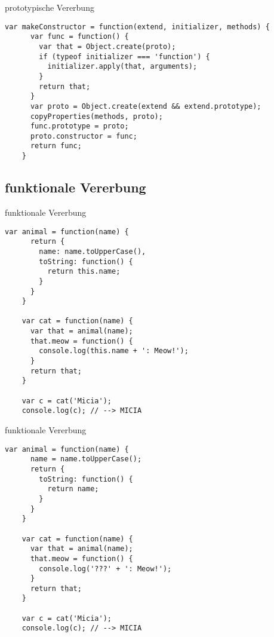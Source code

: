 \begin{frame}[fragile]{prototypische Vererbung}
  \begin{lstlisting}[gobble=4]
    var makeConstructor = function(extend, initializer, methods) {
      var func = function() {
        var that = Object.create(proto);
        if (typeof initializer === 'function') {
          initializer.apply(that, arguments);
        }
        return that;
      }
      var proto = Object.create(extend && extend.prototype);
      copyProperties(methods, proto);
      func.prototype = proto;
      proto.constructor = func;
      return func;
    }
  \end{lstlisting}
\end{frame}

\subsection{funktionale Vererbung}

\begin{frame}[fragile]{funktionale Vererbung}
  \begin{lstlisting}[gobble=4]
    var animal = function(name) {
      return {
        name: name.toUpperCase(),
        toString: function() {
          return this.name;
        }
      }
    }
    
    var cat = function(name) {
      var that = animal(name);
      that.meow = function() {
        console.log(this.name + ': Meow!');
      }
      return that;
    }
    
    var c = cat('Micia');
    console.log(c); // --> MICIA
  \end{lstlisting}
\end{frame}

\begin{frame}[fragile]{funktionale Vererbung}
  \begin{lstlisting}[gobble=4]
    var animal = function(name) {
      name = name.toUpperCase();
      return {
        toString: function() {
          return name;
        }
      }
    }
    
    var cat = function(name) {
      var that = animal(name);
      that.meow = function() {
        console.log('???' + ': Meow!');
      }
      return that;
    }
    
    var c = cat('Micia');
    console.log(c); // --> MICIA
  \end{lstlisting}
\end{frame}

